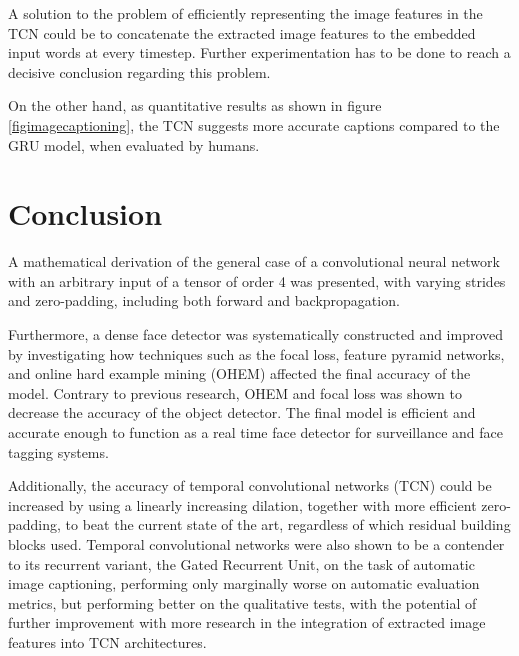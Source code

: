 \documentclass[a4paper, twoside]{article}
\begin{document}
A solution to the problem of efficiently representing the image features in the TCN could be to concatenate the extracted image features to the embedded input words at every timestep. Further experimentation has to be done to reach a decisive conclusion regarding this problem.

On the other hand, as quantitative results as shown in figure \ref{figimagecaptioning}, the TCN suggests more accurate captions compared to the GRU model, when evaluated by humans.

\section{Conclusion} 
A mathematical derivation of the general case of a convolutional neural network with an arbitrary input of a tensor of order 4 was presented, with varying strides and zero-padding, including both forward and backpropagation. 

Furthermore, a dense face detector was systematically constructed and improved by investigating how techniques such as the focal loss, feature pyramid networks, and online hard example mining (OHEM) affected the final accuracy of the model. Contrary to previous research, OHEM and focal loss was shown to decrease the accuracy of the object detector. The final model is efficient and accurate enough to function as a real time face detector for surveillance and face tagging systems.

Additionally, the accuracy of temporal convolutional networks (TCN) could be increased by using a linearly increasing dilation, together with more efficient zero-padding, to beat the current state of the art, regardless of which residual building blocks used. Temporal convolutional networks were also shown to be a contender to its recurrent variant, the Gated Recurrent Unit, on the task of automatic image captioning, performing only marginally worse on automatic evaluation metrics, but performing better on the qualitative tests, with the potential of further improvement with more research in the integration of extracted image features into TCN architectures.
\end{document}
